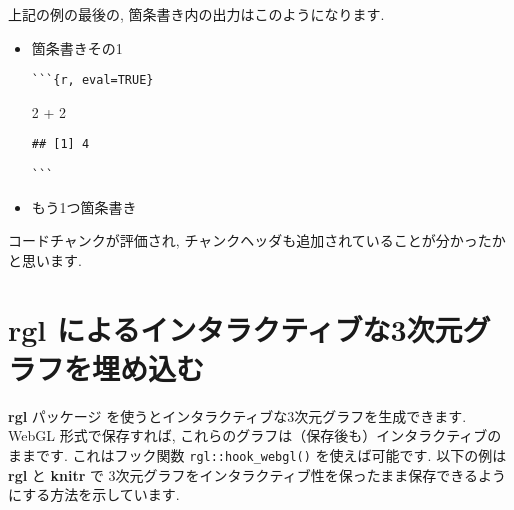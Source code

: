 \documentclass[
  11pt,
  lualatex,ja=standard,jafont=noto]{bxjsreport}
\newenvironment{Shaded}{\begin{snugshade}}{\end{snugshade}}
\newcommand{\DecValTok}[1]{\textcolor[rgb]{0.00,0.00,0.81}{#1}}
\newcommand{\SpecialCharTok}[1]{\textcolor[rgb]{0.00,0.00,0.00}{#1}}
\renewenvironment{quote}{\def\FrameCommand{{\color{quotebarcolor}{\vrule width 3pt}}\hspace{10pt}}\MakeFramed{\advance\hsize-\width\FrameRestore}}{\endMakeFramed}
\begin{document}
上記の例の最後の, 箇条書き内の出力はこのようになります.

\begin{quote}
\begin{itemize}
\item
  箇条書きその1

\begin{verbatim}
```{r, eval=TRUE}
\end{verbatim}

\begin{Shaded}
\begin{Highlighting}[]
\DecValTok{2} \SpecialCharTok{+} \DecValTok{2}
\end{Highlighting}
\end{Shaded}

\begin{verbatim}
## [1] 4
\end{verbatim}

\begin{verbatim}
```
\end{verbatim}
\item
  もう1つ箇条書き
\end{itemize}
\end{quote}

コードチャンクが評価され, チャンクヘッダも追加されていることが分かったかと思います.

\hypertarget{rgl-3d}{%
\section{rgl によるインタラクティブな3次元グラフを埋め込む}\label{rgl-3d}}

\textbf{rgl} パッケージ \autocite{R-rgl} を使うとインタラクティブな3次元グラフを生成できます. WebGL 形式で保存すれば, これらのグラフは（保存後も）インタラクティブのままです. これはフック関数 \texttt{rgl::hook\_webgl()} を使えば可能です. 以下の例は \textbf{rgl} と \textbf{knitr} で 3次元グラフをインタラクティブ性を保ったまま保存できるようにする方法を示しています.
\end{document}
